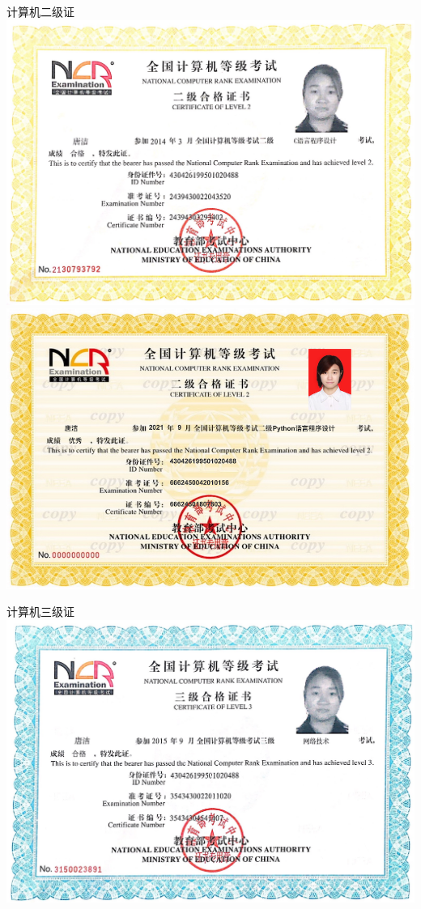 \documentclass[UFT8]{ctexart}%
\begin{document}
\begin{center}
计算机二级证
  \includegraphics[scale=0.22]{figs/计算机二级C.JPG }
  \includegraphics[scale=0.45]{figs/计算机二级Python.JPG }
   
计算机三级证
 \includegraphics[scale=0.22]{figs/计算机三级证书.JPG }
 

\end{center}
\end{document}
